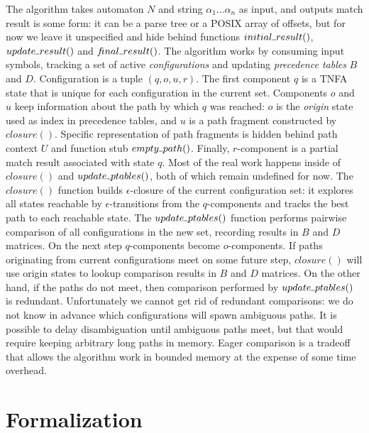 \documentclass[AMA,STIX1COL]{WileyNJD-v2}
\newcommand{\Xund}{\rule{.4em}{.4pt}}
\begin{document}
The algorithm takes automaton $N$ and string $\alpha_1 \!\hdots\! \alpha_n$ as input,
and outputs match result is some form: it can be a parse tree or a POSIX array of offsets,
but for now we leave it unspecified and hide behind functions
$initial \Xund result ()$, $update \Xund result ()$ and $f\!inal \Xund result ()$.
The algorithm works by consuming input symbols,
tracking a set of active \emph{configurations}
and updating \emph{precedence tables} $B$ and $D$.
Configuration is a tuple $(q, o, u, r)$.
The first component $q$ is a TNFA state that is unique for each configuration in the current set.
Components $o$ and $u$ keep information about the path by which $q$ was reached:
$o$ is the \emph{origin} state used as index in precedence tables,
and $u$ is a path fragment constructed by $closure()$.
Specific representation of path fragments is hidden behind path context $U$ and function stub $empty \Xund path ()$.
Finally, $r$-component is a partial match result associated with state $q$.
Most of the real work happens inside of $closure()$ and $update \Xund ptables ()$, both of which remain undefined for now.
The $closure()$ function builds $\epsilon$-closure of the current configuration set:
it explores all states reachable by $\epsilon$-transitions from the $q$-components
and tracks the best path to each reachable state.
The $update \Xund ptables ()$ function
performs pairwise comparison of all configurations in the new set,
recording results in $B$ and $D$ matrices.
On the next step $q$-components become $o$-components.
If paths originating from current configurations meet on some future step,
$closure ()$ will use origin states to lookup comparison results in $B$ and $D$ matrices.
On the other hand, if the paths do not meet, then comparison performed by $update \Xund ptables ()$ is redundant.
Unfortunately we cannot get rid of redundant comparisons:
we do not know in advance which configurations will spawn ambiguous paths.
It is possible to delay disambiguation until ambiguous paths meet,
but that would require keeping arbitrary long paths in memory.
Eager comparison is a tradeoff that allows the algorithm work in bounded memory at the expense of some time overhead.
\\


\section{Formalization}\label{section_formalization}
\end{document}
